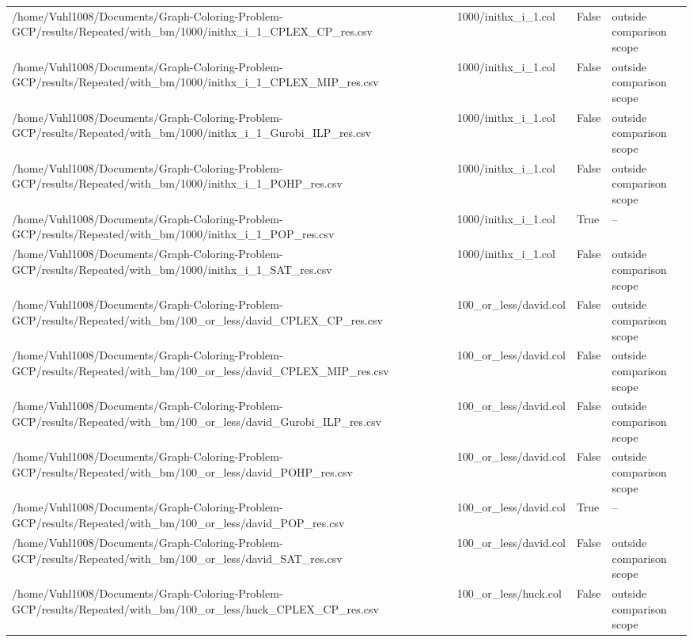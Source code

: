 \begin{table}[htbp]
\begin{tabular}{llll}
/home/Vuhl1008/Documents/Graph-Coloring-Problem-GCP/results/Repeated/with\_bm/1000/inithx\_i\_1\_CPLEX\_CP\_res.csv & 1000/inithx\_i\_1.col & False & outside comparison scope \\
/home/Vuhl1008/Documents/Graph-Coloring-Problem-GCP/results/Repeated/with\_bm/1000/inithx\_i\_1\_CPLEX\_MIP\_res.csv & 1000/inithx\_i\_1.col & False & outside comparison scope \\
/home/Vuhl1008/Documents/Graph-Coloring-Problem-GCP/results/Repeated/with\_bm/1000/inithx\_i\_1\_Gurobi\_ILP\_res.csv & 1000/inithx\_i\_1.col & False & outside comparison scope \\
/home/Vuhl1008/Documents/Graph-Coloring-Problem-GCP/results/Repeated/with\_bm/1000/inithx\_i\_1\_POHP\_res.csv & 1000/inithx\_i\_1.col & False & outside comparison scope \\
/home/Vuhl1008/Documents/Graph-Coloring-Problem-GCP/results/Repeated/with\_bm/1000/inithx\_i\_1\_POP\_res.csv & 1000/inithx\_i\_1.col & True & -- \\
/home/Vuhl1008/Documents/Graph-Coloring-Problem-GCP/results/Repeated/with\_bm/1000/inithx\_i\_1\_SAT\_res.csv & 1000/inithx\_i\_1.col & False & outside comparison scope \\
/home/Vuhl1008/Documents/Graph-Coloring-Problem-GCP/results/Repeated/with\_bm/100\_or\_less/david\_CPLEX\_CP\_res.csv & 100\_or\_less/david.col & False & outside comparison scope \\
/home/Vuhl1008/Documents/Graph-Coloring-Problem-GCP/results/Repeated/with\_bm/100\_or\_less/david\_CPLEX\_MIP\_res.csv & 100\_or\_less/david.col & False & outside comparison scope \\
/home/Vuhl1008/Documents/Graph-Coloring-Problem-GCP/results/Repeated/with\_bm/100\_or\_less/david\_Gurobi\_ILP\_res.csv & 100\_or\_less/david.col & False & outside comparison scope \\
/home/Vuhl1008/Documents/Graph-Coloring-Problem-GCP/results/Repeated/with\_bm/100\_or\_less/david\_POHP\_res.csv & 100\_or\_less/david.col & False & outside comparison scope \\
/home/Vuhl1008/Documents/Graph-Coloring-Problem-GCP/results/Repeated/with\_bm/100\_or\_less/david\_POP\_res.csv & 100\_or\_less/david.col & True & -- \\
/home/Vuhl1008/Documents/Graph-Coloring-Problem-GCP/results/Repeated/with\_bm/100\_or\_less/david\_SAT\_res.csv & 100\_or\_less/david.col & False & outside comparison scope \\
/home/Vuhl1008/Documents/Graph-Coloring-Problem-GCP/results/Repeated/with\_bm/100\_or\_less/huck\_CPLEX\_CP\_res.csv & 100\_or\_less/huck.col & False & outside comparison scope \\

\end{tabular}
\end{table}
